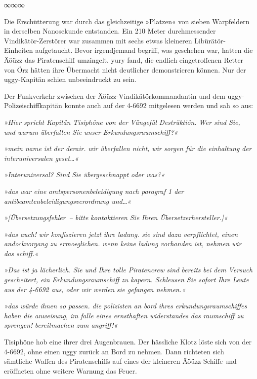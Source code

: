 \begin{center}
    ∞∞∞
\end{center}

Die Erschütterung war durch das gleichzeitige »Platzen« von sieben Warpfeldern in derselben Nanosekunde entstanden. Ein 210 Meter durchmessender Vindikätör-Zerstörer war zusammen mit sechs etwas kleineren Libürätör-Einheiten aufgetaucht. Bevor irgendjemand begriff, was geschehen war, hatten die Äöüzz das Piratenschiff umzingelt. yury fand, die endlich eingetroffenen Retter von Örz hätten ihre Übermacht nicht deutlicher demonstrieren können. Nur der uggy-Kapitän schien unbeeindruckt zu sein.

Der Funkverkehr zwischen der Äöüzz-Vindikätörkommandantin und dem uggy-Polizeischiffkapitän konnte auch auf der 4-6692 mitgelesen werden und sah so aus:

\textit{»Hier spricht Kapitän Tisiphöne von der Vängefül Destrüktiön. Wer sind Sie, und warum überfallen Sie unser Erkundungsraumschiff?«}

\textit{»mein name ist der derair. wir überfallen nicht, wir sorgen für die einhaltung der interuniversalen geset…«}

\textit{»Interuniversal? Sind Sie übergeschnappt oder was?«}

\textit{»das war eine amtspersonenbeleidigung nach paragraf 1 der antibeamtenbeleidigungsverordnung und…«}

\textit{»[Übersetzungsfehler~– bitte kontaktieren Sie Ihren Übersetzerhersteller.]«}

\textit{»das auch! wir konfiszieren jetzt ihre ladung. sie sind dazu verpflichtet, einen andockvorgang zu ermoeglichen. wenn keine ladung vorhanden ist, nehmen wir das schiff.«}

\textit{»Das ist ja lächerlich. Sie und Ihre tolle Piratencrew sind bereits bei dem Versuch gescheitert, ein Erkundungsraumschiff zu kapern. Schleusen Sie sofort Ihre Leute aus der 4-6692 aus, oder wir werden sie gefangen nehmen.«}

\textit{»das würde ihnen so passen. die polizisten an bord ihres erkundungsraumschiffes haben die anweisung, im falle eines ernsthaften widerstandes das raumschiff zu sprengen! bereitmachen zum angriff!«}

Tisiphöne hob eine ihrer drei Augenbrauen. Der hässliche Klotz löste sich von der 4-6692, ohne einen uggy zurück an Bord zu nehmen. Dann richteten sich sämtliche Waffen des Piratenschiffs auf eines der kleineren Äöüzz-Schiffe und eröffneten ohne weitere Warnung das Feuer.

